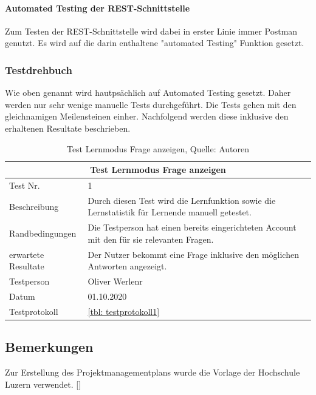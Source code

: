 \paragraph{Automated Testing der REST-Schnittstelle}
Zum Testen der REST-Schnittstelle wird dabei in erster Linie immer Postman genutzt. Es wird auf die darin enthaltene "automated Testing" Funktion gesetzt. 

\subsubsection{Testdrehbuch}\label{testsvonmeilensteine}
Wie oben genannt wird hautpsächlich auf Automated Testing gesetzt.
Daher werden nur sehr wenige manuelle Tests durchgeführt.
Die Tests gehen mit den gleichnamigen Meilensteinen einher.
Nachfolgend werden diese inklusive den erhaltenen Resultate beschrieben.

\begin{table}[H]
\begin{tabularx}{\textwidth}{lX}
  \hline
  \multicolumn{2}{|c|}{Test Lernmodus Frage anzeigen} \\
  \hline
  Test Nr. & 1\\
  Beschreibung & Durch diesen Test wird die Lernfunktion sowie die Lernstatistik für Lernende manuell getestet.\\
  Randbedingungen & Die Testperson hat einen bereits eingerichteten Account mit den für sie relevanten Fragen.\\
  erwartete Resultate & Der Nutzer bekommt eine Frage inklusive den möglichen Antworten angezeigt.  \\
  Testperson & Oliver Werlenr \\
  Datum & 01.10.2020 \\
  Testprotokoll & \ref{tbl: testprotokoll1}\\
   \hline
\end{tabularx}
\caption{ \label{tbl: Test Lernmodus Frage anzeigen}Test Lernmodus Frage anzeigen, Quelle: Autoren}
\end{table}

\subsection{Bemerkungen}
Zur Erstellung des Projektmanagementplans wurde die Vorlage der Hochschule Luzern verwendet. [\cite{pmpHSLU}]
\newpage
